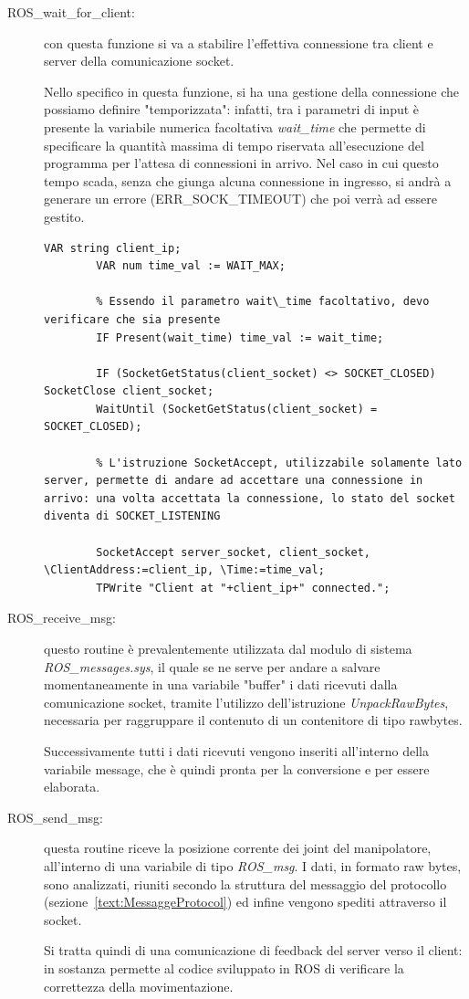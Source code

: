 \begin{description}
	\item[ROS\_wait\_for\_client:] con questa funzione si va a stabilire l'effettiva connessione tra client e server della comunicazione socket.
	
	Nello specifico in questa funzione, si ha una gestione della connessione che possiamo definire "temporizzata": infatti, tra i parametri di input è presente la variabile numerica facoltativa \emph{wait\_time} che permette di specificare la quantità massima di tempo riservata all'esecuzione del programma per l'attesa di connessioni in arrivo. Nel caso in cui questo tempo scada, senza che giunga alcuna connessione in ingresso, si andrà a generare un errore (ERR\_SOCK\_TIMEOUT) che poi verrà ad essere gestito.
	\begin{lstlisting}[style=Matlab-editor,caption=Analisi funzionamento routine ROS-wait-for-client,captionpos=b,label={Code:ROSwaitforclient}, basicstyle=\scriptsize\ttfamily,frame=trBL]	
		VAR string client_ip;
		VAR num time_val := WAIT_MAX; 		

		% Essendo il parametro wait\_time facoltativo, devo verificare che sia presente
		IF Present(wait_time) time_val := wait_time;
		
		IF (SocketGetStatus(client_socket) <> SOCKET_CLOSED) SocketClose client_socket;
		WaitUntil (SocketGetStatus(client_socket) = SOCKET_CLOSED);
		
		% L'istruzione SocketAccept, utilizzabile solamente lato server, permette di andare ad accettare una connessione in arrivo: una volta accettata la connessione, lo stato del socket diventa di SOCKET_LISTENING
		
		SocketAccept server_socket, client_socket, \ClientAddress:=client_ip, \Time:=time_val;
		TPWrite "Client at "+client_ip+" connected.";
	\end{lstlisting}
\end{description}
\begin{description}
	\item[ROS\_receive\_msg:] questo routine è prevalentemente utilizzata dal modulo di sistema \emph{ROS\_messages.sys}, il quale se ne serve per andare a salvare momentaneamente in una variabile "buffer" i dati ricevuti dalla comunicazione socket, tramite l'utilizzo dell'istruzione \emph{UnpackRawBytes}, necessaria per raggruppare il contenuto di un contenitore di tipo rawbytes.
	
	Successivamente tutti i dati ricevuti vengono inseriti all'interno della variabile message, che è quindi pronta per la conversione e per essere elaborata.
	\item[ROS\_send\_msg:] questa routine riceve la posizione corrente dei joint del manipolatore, all'interno di una variabile di tipo \emph{ROS\_msg}. I dati, in formato raw bytes, sono analizzati, riuniti secondo la struttura del messaggio del protocollo (sezione~\vref{text:MessaggeProtocol}) ed infine vengono spediti attraverso il socket. 

	Si tratta quindi di una comunicazione di feedback del server verso il client: in sostanza permette al codice sviluppato in ROS di verificare la correttezza della movimentazione.
\end{description}
